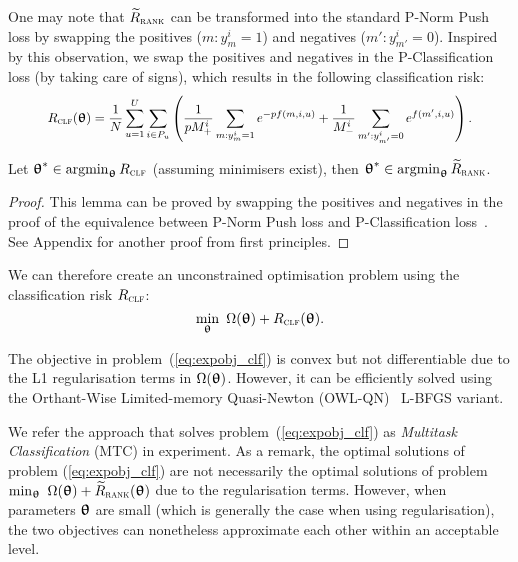 One may note that $\widetilde R_\textsc{rank}$ can be transformed into the standard P-Norm Push loss by swapping the
positives ($m: y_m^i = 1$) and negatives ($m': y_{m'}^i = 0$). %
Inspired by this observation, we swap the positives and negatives in the P-Classification loss (by taking care of signs),
which results in the following classification risk:
\begin{equation}
\label{eq:clfrisk}
\resizebox{.88\linewidth}{!}{$\displaystyle
R_\textsc{clf}(\upthetabm)
= \frac{1}{N} \sum_{u=1}^U \sum_{i \in P_u} \left(
  \frac{1}{p M_+^i} \sum_{m: y_m^i = 1} e^{-p f(m, i, u)}
  + \frac{1}{M_-^i} \sum_{m': y_{m'}^i = 0} e^{f(m', i, u)} \right).
$}
\end{equation}

\begin{lemma}
\label{lm:rank2clf}
Let ${\bm{\uptheta}}^* \in \operatorname*{argmin}_{{\bm{\uptheta}}} R_\textsc{clf}$ (assuming minimisers exist),
then ${\bm{\uptheta}}^* \in \operatorname*{argmin}_{{\bm{\uptheta}}} \widetilde R_\textsc{rank}$.
\end{lemma}

\begin{proof}
This lemma can be proved by swapping the positives and negatives in the proof of 
the equivalence between P-Norm Push loss and P-Classification loss~\cite{ertekin2011equivalence}.
See Appendix for another proof from first principles.
\end{proof}

We can therefore create an unconstrained optimisation problem using the classification risk $R_\textsc{clf}$:
\begin{equation}
\label{eq:expobj_clf}
\min_{\bm{\uptheta}} \ \Omega({\bm{\uptheta}}) + R_\textsc{clf}({\bm{\uptheta}}).
\end{equation}

The objective in problem~(\ref{eq:expobj_clf}) is convex but not differentiable due to the L1 regularisation terms in $\Omega({\bm{\uptheta}})$.
However, it can be efficiently solved using the Orthant-Wise Limited-memory Quasi-Newton (OWL-QN)~\cite{andrew2007scalable} L-BFGS variant.

We refer the approach that solves problem~(\ref{eq:expobj_clf}) as \emph{Multitask Classification} (MTC) in experiment.
As a remark, the optimal solutions of problem (\ref{eq:expobj_clf}) are not necessarily the optimal solutions 
of problem $\min_{\bm{\uptheta}} \ \Omega({\bm{\uptheta}}) + \widetilde R_\textsc{rank}({\bm{\uptheta}})$ due to the regularisation terms.
However, when parameters ${\bm{\uptheta}}$ are small (which is generally the case when using regularisation), the two objectives 
can nonetheless approximate each other within an acceptable level.



